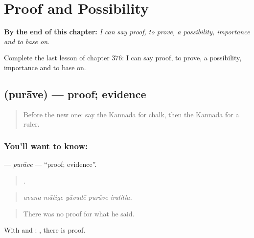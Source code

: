 
\chapter{Proof and Possibility}
\label{ch:ka-proof-and-possibility}

\begin{chapteropening}
\textbf{By the end of this chapter:} \emph{I can say proof, to prove, a possibility, importance and to base on.}

Complete the last lesson of chapter 376: I can say proof, to prove, a possibility, importance and to base on.
\end{chapteropening}

\section[\texorpdfstring{\kn{ಪುರಾವೆ} (purāve)}{ಪುರಾವೆ (purāve)}]{ (purāve) — proof; evidence}

\label{lesson:KA-C376-purave}



\begin{quote}
Before the new one: say the Kannada for chalk, then the Kannada for a ruler.
\end{quote}

\subsection*{You'll want to know: }
\textbf{} — \emph{purāve} — \textquotedblleft{}proof; evidence\textquotedblright{}.

\begin{quote}
    .
\end{quote}

\begin{quote}
\emph{avana mātige yāvudē purāve iralilla.}
\end{quote}

\begin{quote}
There was no proof for what he said.
\end{quote}

With  and :  , there is proof.

